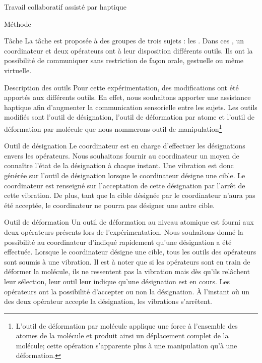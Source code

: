 \documentclass[myfrancais]{mythesis}
\begin{document}
\begin{mychapter}{Travail collaboratif assisté par haptique}
\begin{mysection}{Méthode}
\begin{mysubsection}{Tâche}
				La tâche est proposée à des groupes de trois sujets : les .
				Dans ces , un \og coordinateur \fg et deux \og opérateurs \fg ont à leur disposition différents outils.
				Ils ont la possibilité de communiquer sans restriction de façon orale, gestuelle ou même virtuelle.
				\begin{mysubsubsection}{Description des outils}
					Pour cette expérimentation, des modifications ont été apportés aux différents outils.
					En effet, nous souhaitons apporter une assistance haptique afin d'augmenter la communication sensorielle entre les sujets.
					Les outils modifiés sont l'outil de désignation, l'outil de déformation par atome et l'outil de déformation par molécule que nous nommerons outil de manipulation\footnote{L'outil de déformation par molécule applique une force à l'ensemble des atomes de la molécule et produit ainsi un déplacement complet de la molécule; cette opération s'apparente plus à une manipulation qu'à une déformation.}
					\begin{myparagraph}{Outil de désignation}
						Le coordinateur est en charge d'effectuer les désignations envers les opérateurs.
						Nous souhaitons fournir au coordinateur un moyen de connaître l'état de la désignation à chaque instant.
						Une vibration est donc générée sur l'outil de désignation lorsque le coordinateur désigne une cible.
						Le coordinateur est renseigné sur l'acceptation de cette désignation par l'arrêt de cette vibration.
						De plus, tant que la cible désignée par le coordinateur n'aura pas été acceptée, le coordinateur ne pourra pas désigner une autre cible.
					\end{myparagraph}
					\begin{myparagraph}{Outil de déformation}
						Un outil de déformation au niveau atomique est fourni aux deux opérateurs présents lors de l'expérimentation.
						Nous souhaitons donné la possibilité au coordinateur d'indiqué rapidement qu'une désignation a été effectuée.
						Lorsque le coordinateur désigne une cible, tous les outils des opérateurs sont soumis à une vibration.
						Il est à noter que si les opérateurs sont en train de déformer la molécule, ils ne ressentent pas la vibration mais dès qu'ils relâchent leur sélection, leur outil leur indique qu'une désignation est en cours.
						Les opérateurs ont la possibilité d'accepter ou non la désignation.
						À l'instant où un des deux opérateur accepte la désignation, les vibrations s'arrêtent.

\end{myparagraph}
\end{mysubsubsection}
\end{mysubsection}
\end{mysection}
\end{mychapter}
\end{document}
